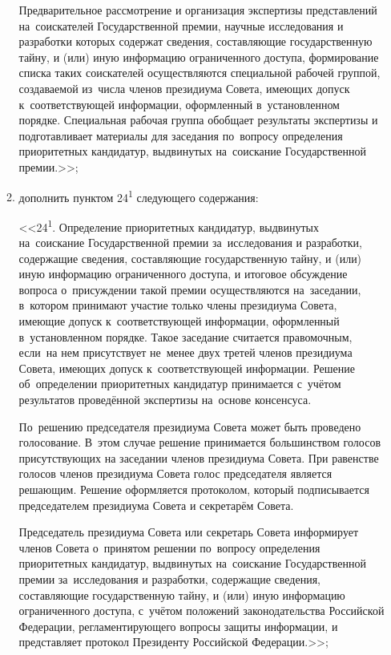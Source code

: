\documentclass[14pt, a4paper]{extarticle}
\begin{document}
\begin{enumerate}
\begin{enumerate}[label=\asbuk*), ref=\asbuk*]
		Предварительное рассмотрение и организация экспертизы представлений на~соискателей Государственной премии, научные исследования и разработки которых содержат сведения, составляющие государственную тайну, и (или) иную информацию ограниченного доступа, формирование списка таких соискателей осуществляются специальной рабочей группой, создаваемой из~числа членов президиума Совета, имеющих допуск к~соответствующей информации, оформленный в~установленном порядке. Специальная рабочая группа обобщает результаты экспертизы и подготавливает материалы для заседания по~вопросу определения приоритетных кандидатур, выдвинутых на~соискание Государственной премии.>>;
		
		\item дополнить пунктом 24\textsuperscript{1} следующего содержания:
		
		<<24\textsuperscript{1}. Определение приоритетных кандидатур, выдвинутых на~соискание Государственной премии за~исследования и разработки, содержащие сведения, составляющие государственную тайну, и (или) иную информацию ограниченного доступа, и итоговое обсуждение вопроса о~присуждении такой премии осуществляются на~заседании, в~котором принимают участие только члены президиума Совета, имеющие допуск к~соответствующей информации, оформленный в~установленном порядке. Такое заседание считается правомочным, если~на нем присутствует не~менее двух третей членов президиума Совета, имеющих допуск к~соответствующей информации. Решение об~определении приоритетных кандидатур принимается с~учётом результатов проведённой экспертизы на~основе консенсуса.
		
		По~решению председателя президиума Совета может быть проведено голосование. В~этом случае решение принимается большинством голосов присутствующих на заседании членов президиума Совета. При равенстве голосов членов президиума Совета голос председателя является решающим. Решение оформляется протоколом, который подписывается председателем президиума Совета и секретарём Совета.
		
		Председатель президиума Совета или секретарь Совета информирует членов Совета о~принятом решении по~вопросу определения приоритетных кандидатур, выдвинутых на~соискание Государственной премии за~исследования и разработки, содержащие сведения, составляющие государственную тайну, и (или) иную информацию ограниченного доступа, с~учётом положений законодательства Российской Федерации, регламентирующего вопросы защиты информации, и представляет протокол Президенту Российской Федерации.>>;
		

\end{enumerate}
\end{enumerate}
\end{document}
